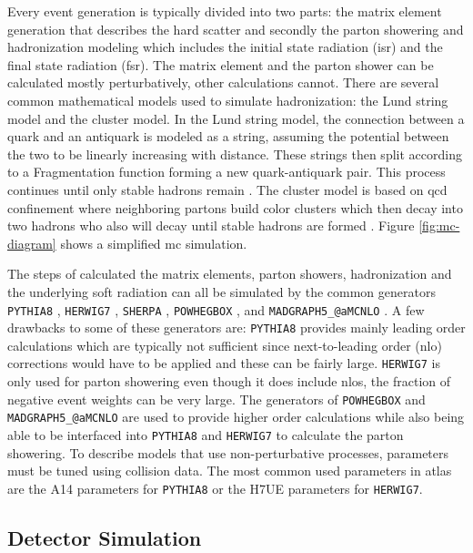 Every event generation is typically divided into two parts: the matrix element generation that describes the hard scatter and secondly the parton showering and hadronization modeling 
which includes the initial state radiation (\gls{isr}) and the final state radiation (\gls{fsr}). The matrix element and the parton shower can be calculated mostly perturbatively, other 
calculations cannot. There are several common mathematical models used to simulate hadronization: the Lund string model and the cluster model. In the Lund string model, the connection 
between a quark and an antiquark is modeled as a string, assuming the potential between the two to be linearly increasing with distance. These strings then split according to a 
Fragmentation function forming a new quark-antiquark pair. This process continues until only stable hadrons remain \cite{Lund-string}. The cluster model is based on \gls{qcd} confinement where 
neighboring partons build color clusters which then decay into two hadrons who also will decay until stable hadrons are formed \cite{Jan-cluster}. Figure \ref{fig:mc-diagram} shows a simplified \gls{mc} simulation.
\par
The steps of calculated the matrix elements, parton showers, hadronization and the underlying soft radiation can all be simulated by the common generators \texttt{PYTHIA8} \cite{pythia-stefan}, \texttt{HERWIG7} \cite{herwig},
\texttt{SHERPA} \cite{sherpa-enrico}, \texttt{POWHEGBOX} \cite{powheg}, and \texttt{MADGRAPH5\_@aMCNLO} \cite{madgraph}. A few drawbacks to some of these generators are: \texttt{PYTHIA8} provides mainly leading order calculations which are typically not sufficient since next-to-leading 
order (\gls{nlo}) corrections would have to be applied and these can be fairly large. \texttt{HERWIG7} is only used for parton showering even though it does include \gls{nlo}s, the fraction 
of negative event weights can be very large. The generators of \texttt{POWHEGBOX} and \texttt{MADGRAPH5\_@aMCNLO} are used to provide higher order calculations while also being able to 
be interfaced into \texttt{PYTHIA8} and \texttt{HERWIG7} to calculate the parton showering. To describe models that use non-perturbative processes, parameters must be tuned using 
collision data. The most common used parameters in \gls{atlas} are the A14 \cite{pythia-para} parameters for \texttt{PYTHIA8} or the H7UE \cite{herwig-para} parameters for \texttt{HERWIG7}.

\subsection{Detector Simulation}

